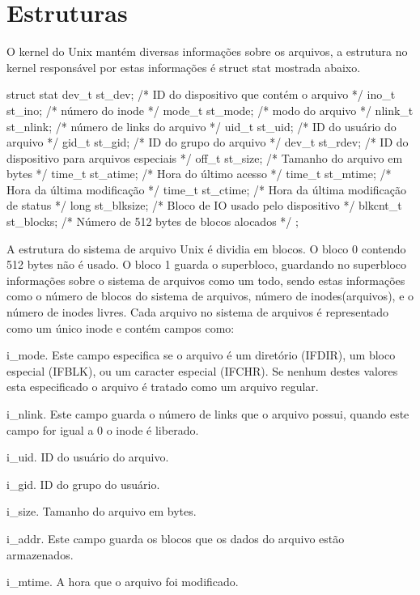\section{Estruturas}

O kernel do Unix mantém diversas informações sobre os arquivos, a estrutura no kernel responsável por estas informações é struct stat mostrada abaixo.

struct stat {
    dev_t     st_dev;     /* ID do dispositivo que contém o arquivo */
    ino_t     st_ino;     /* número do inode */
    mode_t    st_mode;    /* modo do arquivo */
    nlink_t st_nlink;     /* número de links do arquivo */
    uid_t     st_uid;     /* ID do usuário do arquivo */
    gid_t     st_gid;     /* ID do grupo do arquivo */
    dev_t     st_rdev;    /* ID do dispositivo para arquivos especiais */
    off_t     st_size;    /* Tamanho do arquivo em bytes */
    time_t    st_atime;   /* Hora do último acesso */
    time_t    st_mtime;   /* Hora da última modificação */
    time_t    st_ctime;   /* Hora da última modificação de status */
    long      st_blksize; /* Bloco de IO usado pelo dispositivo */
    blkcnt_t st_blocks;   /* Número de 512 bytes de blocos alocados */
};



A estrutura do sistema de arquivo Unix é dividia em blocos. O bloco 0 contendo 512 bytes não é usado. O bloco 1 guarda o superbloco, guardando no superbloco informações sobre o sistema de arquivos como um todo, sendo estas informações como o número de blocos do sistema de arquivos, número de inodes(arquivos), e o número de inodes livres. Cada arquivo no sistema de arquivos é representado como um único inode e contém campos como:

i_mode. Este campo especifica se o arquivo é um diretório (IFDIR), um bloco especial (IFBLK), ou um caracter especial (IFCHR). Se nenhum destes valores esta especificado o arquivo é tratado como um arquivo regular.

i_nlink. Este campo guarda o número de links que o arquivo possui, quando este campo for igual a 0 o inode é liberado.

i_uid. ID do usuário do arquivo.

i_gid. ID do grupo do usuário.

i_size. Tamanho do arquivo em bytes.

i_addr. Este campo guarda os blocos que os dados do arquivo estão armazenados.

i_mtime. A hora que o arquivo foi modificado.

